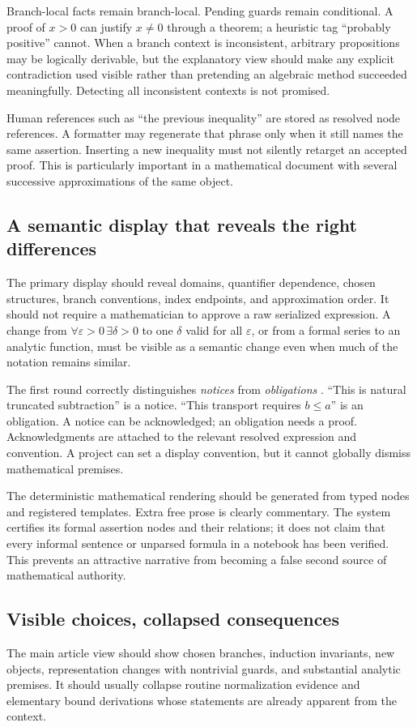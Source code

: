 \documentclass[11pt,letterpaper]{article}
\theoremstyle{definition}
\begin{document}
Branch-local facts remain branch-local. Pending guards remain conditional.
A proof of \(x>0\) can justify \(x\ne0\) through a theorem; a heuristic tag
``probably positive'' cannot. When a branch context is inconsistent, arbitrary
propositions may be logically derivable, but the explanatory view should make any
explicit contradiction used visible rather than pretending an algebraic method
succeeded meaningfully. Detecting all inconsistent contexts is not promised.

Human references such as ``the previous inequality'' are stored as resolved node
references. A formatter may regenerate that phrase only when it still names the
same assertion. Inserting a new inequality must not silently retarget an accepted
proof. This is particularly important in a mathematical document with several
successive approximations of the same object.

\subsection{A semantic display that reveals the right differences}
The primary display should reveal domains, quantifier dependence, chosen structures,
branch conventions, index endpoints, and approximation order. It should not require
a mathematician to approve a raw serialized expression. A change from
\(\forall\varepsilon>0\,\exists\delta>0\) to one \(\delta\) valid for all
\(\varepsilon\), or from a formal series to an analytic function, must be visible
as a semantic change even when much of the notation remains similar.

The first round correctly distinguishes \emph{notices} from \emph{obligations}
\cite{synthesis,review}. ``This is natural truncated subtraction'' is a notice.
``This transport requires \(b\le a\)'' is an obligation. A notice can be acknowledged;
an obligation needs a proof. Acknowledgments are attached to the relevant resolved
expression and convention. A project can set a display convention, but it cannot
globally dismiss mathematical premises.

The deterministic mathematical rendering should be generated from typed nodes
and registered templates. Extra free prose is clearly commentary. The system
certifies its formal assertion nodes and their relations; it does not claim that
every informal sentence or unparsed formula in a notebook has been verified.
This prevents an attractive narrative from becoming a false second source of
mathematical authority.

\subsection{Visible choices, collapsed consequences}
The main article view should show chosen branches, induction invariants, new
objects, representation changes with nontrivial guards, and substantial analytic
premises. It should usually collapse routine normalization evidence and elementary
bound derivations whose statements are already apparent from the context.
\end{document}
